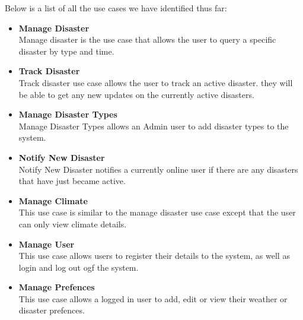 Below is a list of all the use cases we have identified thus far:
\begin{itemize}%
	\item \textbf{Manage Disaster}\\ Manage disaster is the use case that allows the user to query a specific disaster by type and time.
	\item \textbf{Track Disaster} \\ Track disaster use case allows the user to track an active disaster. they will be able to get any new updates on the currently active disasters.
	\item \textbf{Manage Disaster Types} \\ Manage Disaster Types allows an Admin user to add disaster types to the system.
	\item \textbf{Notify New Disaster} \\ Notify New Disaster notifies a currently online user if there are any disasters that have just became active. 
	\item \textbf{Manage Climate} \\ This use case is similar to the manage disaster use case except that the user can only view climate details.
	\item \textbf{Manage User} \\ This use case allows users to register their details to the system, as well as login and log out ogf the system.
	\item \textbf{Manage Prefences} \\ This use case allows a logged in user to add, edit or view their weather or disaster prefences.
\end{itemize}